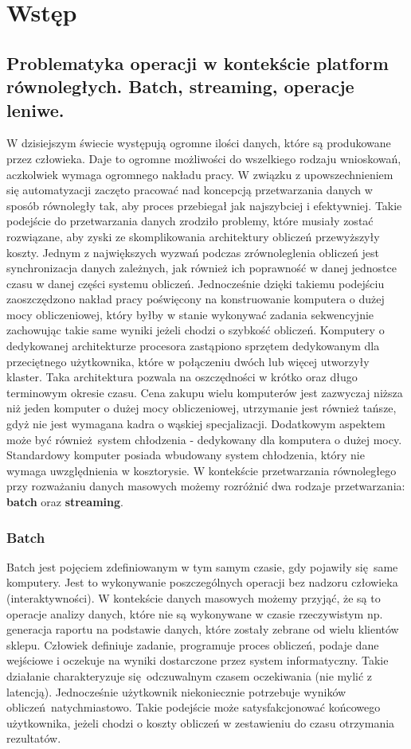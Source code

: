 \chapter{Wstęp} \label{chap.introduction}

\section{Problematyka operacji w kontekście platform równoległych. Batch, streaming, operacje leniwe.}
W dzisiejszym świecie występują ogromne ilości danych, które są produkowane przez człowieka. Daje to ogromne możliwości do wszelkiego rodzaju wnioskowań, aczkolwiek wymaga ogromnego nakładu pracy. W związku z upowszechnieniem się automatyzacji zaczęto pracować nad koncepcją przetwarzania danych w sposób równoległy tak, aby proces przebiegał jak najszybciej i efektywniej. Takie podejście do przetwarzania danych zrodziło problemy, które musiały zostać rozwiązane, aby zyski ze skomplikowania architektury obliczeń przewyższyły koszty. Jednym z największych wyzwań podczas zrównoleglenia obliczeń jest synchronizacja danych zależnych, jak również ich poprawność w danej jednostce czasu w danej części systemu obliczeń. Jednocześnie dzięki takiemu podejściu zaoszczędzono nakład pracy poświęcony na konstruowanie komputera o dużej mocy obliczeniowej, który byłby w stanie wykonywać zadania sekwencyjnie zachowując takie same wyniki jeżeli chodzi o szybkość obliczeń. Komputery o dedykowanej architekturze procesora zastąpiono sprzętem dedykowanym dla przeciętnego użytkownika, które w połączeniu dwóch lub więcej utworzyły klaster. Taka architektura pozwala na oszczędności w krótko oraz długo terminowym okresie czasu. Cena zakupu wielu komputerów jest zazwyczaj niższa niż jeden komputer o dużej mocy obliczeniowej, utrzymanie jest również tańsze, gdyż nie jest wymagana kadra o wąskiej specjalizacji. Dodatkowym aspektem może być również system chłodzenia - dedykowany dla komputera o dużej mocy. Standardowy komputer posiada wbudowany system chłodzenia, który nie wymaga uwzględnienia w kosztorysie. W kontekście przetwarzania równoległego przy rozważaniu danych masowych możemy rozróżnić dwa rodzaje przetwarzania: \textbf{batch} oraz \textbf{streaming}.
\subsection{Batch}\label{batch_subsection}
Batch jest pojęciem zdefiniowanym w tym samym czasie, gdy pojawiły się same komputery. Jest to wykonywanie poszczególnych operacji bez nadzoru człowieka (interaktywności). W kontekście danych masowych możemy przyjąć, że są to operacje analizy danych, które nie są wykonywane w czasie rzeczywistym np. generacja raportu na podstawie danych, które zostały zebrane od wielu klientów sklepu. Człowiek definiuje zadanie, programuje proces obliczeń, podaje dane wejściowe i oczekuje na wyniki dostarczone przez system informatyczny. Takie działanie charakteryzuje się odczuwalnym czasem oczekiwania (nie mylić z latencją). Jednocześnie użytkownik niekoniecznie potrzebuje wyników obliczeń natychmiastowo. Takie podejście może satysfakcjonować końcowego użytkownika, jeżeli chodzi o koszty obliczeń w zestawieniu do czasu otrzymania rezultatów.
